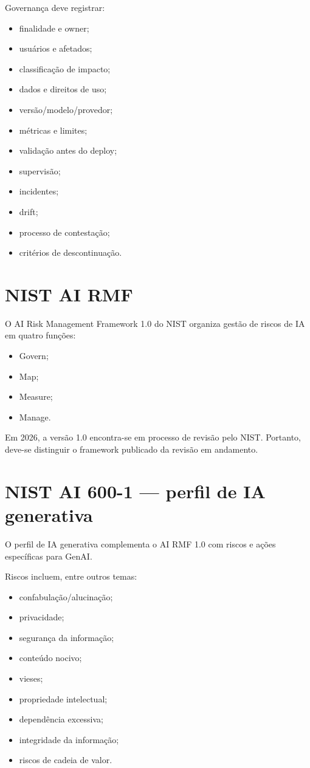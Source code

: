 Governança deve registrar:
\begin{itemize}
\item finalidade e owner;
\item usuários e afetados;
\item classificação de impacto;
\item dados e direitos de uso;
\item versão/modelo/provedor;
\item métricas e limites;
\item validação antes do deploy;
\item supervisão;
\item incidentes;
\item drift;
\item processo de contestação;
\item critérios de descontinuação.
\end{itemize}

\section{NIST AI RMF}

O AI Risk Management Framework 1.0 do NIST organiza gestão de riscos de IA em quatro funções:
\begin{itemize}
\item Govern;
\item Map;
\item Measure;
\item Manage.
\end{itemize}

Em 2026, a versão 1.0 encontra-se em processo de revisão pelo NIST. Portanto, deve-se distinguir o framework publicado da revisão em andamento.

\section{NIST AI 600-1 — perfil de IA generativa}

O perfil de IA generativa complementa o AI RMF 1.0 com riscos e ações específicas para GenAI.

Riscos incluem, entre outros temas:
\begin{itemize}
\item confabulação/alucinação;
\item privacidade;
\item segurança da informação;
\item conteúdo nocivo;
\item vieses;
\item propriedade intelectual;
\item dependência excessiva;
\item integridade da informação;
\item riscos de cadeia de valor.
\end{itemize}

